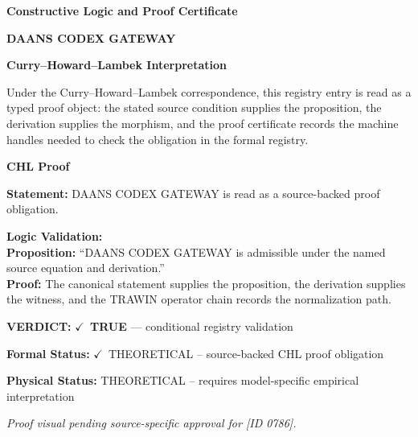 \clearpage
\begingroup\tzpsupportsetup
\noindent\textbf{\fontsize{10.8pt}{12.8pt}\selectfont [ID 0786] Constructive Logic and Proof Certificate}\par
\noindent\textbf{\fontsize{10pt}{12pt}\selectfont DAANS CODEX GATEWAY}\par
\vspace{0.45em}
\begingroup
\footnotesize
\setlength{\parskip}{0.22em}
\setlength{\parindent}{0pt}
\noindent\textbf{Curry--Howard--Lambek Interpretation}\par
Under the Curry--Howard--Lambek correspondence, this registry entry is read as a typed proof
object: the stated source condition supplies the proposition, the derivation supplies the
morphism, and the proof certificate records the machine handles needed to check the obligation
in the formal registry.

\vspace{0.45em}
\noindent\textbf{CHL Proof}\par
\textbf{Statement:} DAANS CODEX GATEWAY is read as a source-backed proof obligation.

\textbf{Logic Validation:}\\
\textbf{Proposition:} ``DAANS CODEX GATEWAY is admissible under the named source equation and derivation.''\\
\textbf{Proof:} The canonical statement supplies the proposition, the derivation supplies the witness, and the TRAWIN operator chain records the normalization path.

\textbf{VERDICT:} \ensuremath{\checkmark}\ \textbf{TRUE} --- conditional registry validation

\textbf{Formal Status:} \ensuremath{\checkmark}\ THEORETICAL -- source-backed CHL proof obligation

\textbf{Physical Status:} THEORETICAL -- requires model-specific empirical interpretation
\par\vspace{0.45em}
\par
\vfill
\begingroup\footnotesize\itshape
Proof visual pending source-specific approval for [ID 0786].
\par\endgroup
\vfill
\endgroup
\endgroup
